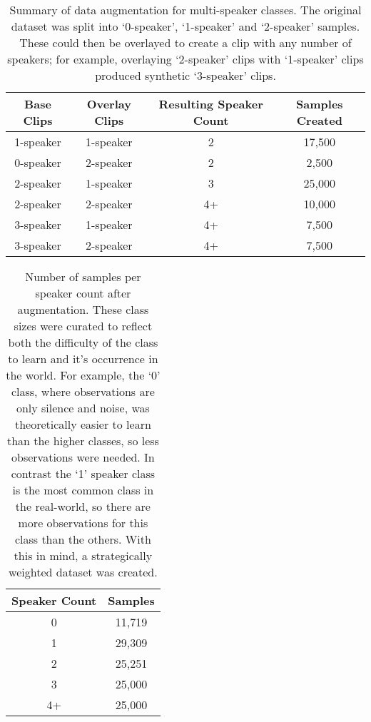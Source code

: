 \begin{table}[H]
  \centering
  \caption{Summary of data augmentation for multi-speaker classes. The original dataset was split into `0-speaker', `1-speaker' and `2-speaker' samples. These could then be overlayed to create a clip with any number of speakers; for example, overlaying `2-speaker' clips with `1-speaker' clips produced synthetic `3-speaker' clips.}
  \label{tab:augmentation_summary}
  \begin{tabular}{|c|c|c|c|}
    \hline
    \textbf{Base Clips} & \textbf{Overlay Clips} & \textbf{Resulting Speaker Count} & \textbf{Samples Created} \\
    \hline
    1-speaker & 1-speaker & 2 & 17,500 \\
    \hline
    0-speaker & 2-speaker & 2 & 2,500 \\
    \hline
    2-speaker & 1-speaker & 3 & 25,000 \\
    \hline
    2-speaker & 2-speaker & 4+ & 10,000 \\
    \hline
    3-speaker & 1-speaker & 4+ & 7,500 \\
    \hline
    3-speaker & 2-speaker & 4+ & 7,500 \\
    \hline
  \end{tabular}
\end{table}




\begin{table}[H]
  \centering
  \caption{Number of samples per speaker count after augmentation. These class sizes were curated to reflect both the difficulty of the class to learn and it's occurrence in the world. For example, the `0' class, where observations are only silence and noise, was theoretically easier to learn than the higher classes, so less observations were needed. In contrast the `1' speaker class is the most common class in the real-world, so there are more observations for this class than the others. With this in mind, a strategically weighted dataset was created.}
  \label{tab:samples_aug}
  \begin{tabular}{|c|c|}
    \hline
    \textbf{Speaker Count} & \textbf{Samples} \\
    \hline
    0 & 11,719 \\
    \hline
    1 & 29,309 \\
    \hline
    2 & 25,251 \\
    \hline
    3 & 25,000 \\
    \hline
    4+ & 25,000 \\
    \hline
  \end{tabular}
\end{table}

